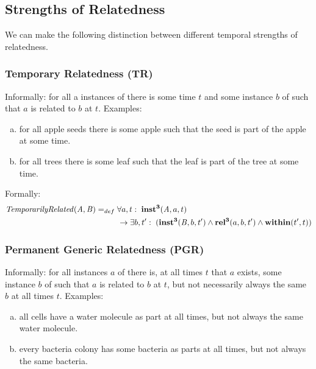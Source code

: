 \subsection*{Strengths of Relatedness}

We can make the following distinction between different temporal strengths of relatedness.

\subsubsection{Temporary Relatedness (TR)}

Informally: for all a instances of  there is some time $t$ and some instance $b$ of
 such that $a$ is related to $b$ at $t$. Examples:
\begin{enumerate}[(a)]
\item for all apple seeds there is
some apple such that the seed is part of the apple at some time.
\item for all
trees there is some leaf such that the leaf is part of the tree at some time.
\end{enumerate}

Formally:
\begin{equation}
\begin{split}
\mathit{TemporarilyRelated}(\mathit{A},\mathit{B}) =_{def}&\;
\forall a, t:\; \mathrm{\mathbf{inst^3}}(\mathit{A}, a, t) \\
&\ \rightarrow
\exists b, t^\prime:\;(\mathrm{\mathbf{inst^3}}(\mathit{B},b,t^\prime) \wedge
\mathrm{\mathbf{rel^3}}(a,b,t^\prime) \wedge \mathrm{\mathbf{within}}(t^\prime,t))
\end{split}
\label{eq:temporarily:cls}
\end{equation}

\subsubsection{Permanent Generic Relatedness (PGR)}

Informally: for all instances $a$ of  there is, at all times $t$ that
$a$ exists,
some instance $b$ of  such that $a$ is related to $b$ at $t$, but not necessarily
always the same $b$ at all times $t$. Examples:
\begin{enumerate}[(a)]
\item all cells have a water molecule as
part at all times, but not always the same water molecule.
\item every bacteria colony has some bacteria as parts at all times, but not
always the same bacteria.
\end{enumerate}


